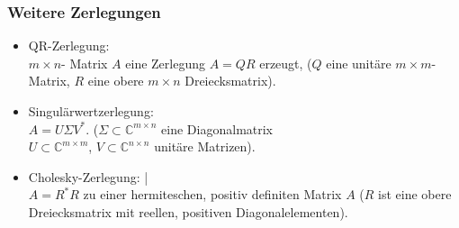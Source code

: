\documentclass[hyperref={xetex}]{beamer}
\begin{document}
\begin{frame}[fragile]\frametitle{Weitere Zerlegungen}
\begin{itemize}
\item \alert{QR-Zerlegung}: \\
  $m \times n$- Matrix $A$ eine Zerlegung { $A=QR$} erzeugt,
  ($Q$ eine unitäre $m \times m$-Matrix, $R$ eine obere $m \times n$ Dreiecksmatrix).
\item \alert{Singulärwertzerlegung}: \\
  { $A=U \Sigma V^*$}. 
  ($\Sigma \subset \mathbb{C}^{m \times n}$ eine Diagonalmatrix \\
  $U \subset \mathbb{C}^{m \times m}$, $V \subset  \mathbb{C}^{n \times n}$ unitäre Matrizen). 

\item \alert{Cholesky-Zerlegung}: | \\
  { $A=R^*R$} zu einer hermiteschen, positiv definiten Matrix
  $A$ ($R$ ist eine obere Dreiecksmatrix mit reellen, positiven
  Diagonalelementen). 
\end{itemize}


\end{frame}
\end{document}
